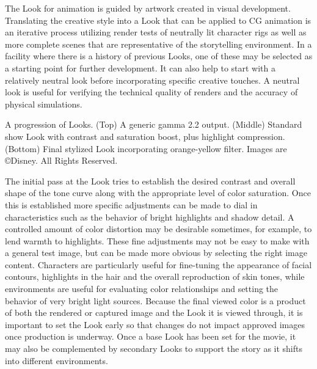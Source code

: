 The Look for animation is guided by artwork created in visual development. Translating the creative style into a Look that can be applied to CG animation is an iterative process utilizing render tests of neutrally lit character rigs as well as more complete scenes that are representative of the storytelling environment. In a facility where there is a history of previous Looks, one of these may be selected as a starting point for further development. It can also help to start with a relatively neutral look before incorporating specific creative touches. A neutral look is useful for verifying the technical quality of renders and the accuracy of physical simulations.




A progression of Looks. (Top) A generic gamma 2.2 output. (Middle) Standard show Look with contrast and saturation boost, plus highlight compression. (Bottom) Final stylized Look incorporating orange-yellow filter.
 Images are ©Disney. All Rights Reserved.

The initial pass at the Look tries to establish the desired contrast and overall shape of the tone curve along with the appropriate level of color saturation. Once this is established more specific adjustments can be made to dial in characteristics such as the behavior of bright highlights and shadow detail. A controlled amount of color distortion may be desirable sometimes, for example, to lend warmth to highlights. These fine adjustments may not be easy to make with a general test image, but can be made more obvious by selecting the right image content. Characters are particularly useful for fine-tuning the appearance of facial contours, highlights in the hair and the overall reproduction of skin tones, while environments are useful for evaluating color relationships and setting the behavior of very bright light sources. Because the final viewed color is a product of both the rendered or captured image and the Look it is viewed through, it is important to set the Look early so that changes do not impact approved images once production is underway. Once a base Look has been set for the movie, it may also be complemented by secondary Looks to support the story as it shifts into different environments.




